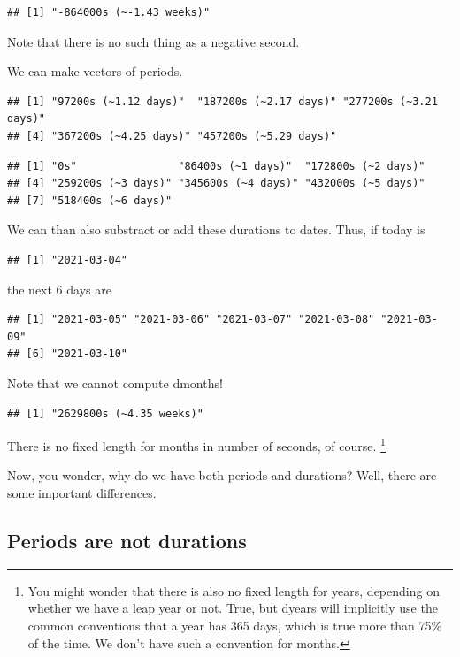 \documentclass[]{tufte-book}
\begin{document}
\begin{verbatim}
## [1] "-864000s (~-1.43 weeks)"
\end{verbatim}

Note that there is no such thing as a negative second.

We can make vectors of periods.

\begin{verbatim}
## [1] "97200s (~1.12 days)"  "187200s (~2.17 days)" "277200s (~3.21 days)"
## [4] "367200s (~4.25 days)" "457200s (~5.29 days)"
\end{verbatim}

\begin{verbatim}
## [1] "0s"                "86400s (~1 days)"  "172800s (~2 days)"
## [4] "259200s (~3 days)" "345600s (~4 days)" "432000s (~5 days)"
## [7] "518400s (~6 days)"
\end{verbatim}

We can than also substract or add these durations to dates. Thus, if today is

\begin{verbatim}
## [1] "2021-03-04"
\end{verbatim}

the next 6 days are

\begin{verbatim}
## [1] "2021-03-05" "2021-03-06" "2021-03-07" "2021-03-08" "2021-03-09"
## [6] "2021-03-10"
\end{verbatim}

Note that we cannot compute dmonths!

\begin{verbatim}
## [1] "2629800s (~4.35 weeks)"
\end{verbatim}

There is no fixed length for months in number of seconds, of course. \footnote{You might wonder that there is also no fixed length for years, depending on whether we have a leap year or not. True, but dyears will implicitly use the common conventions that a year has 365 days, which is true more than 75\% of the time. We don't have such a convention for months.}

Now, you wonder, why do we have both periods and durations? Well, there are some important differences.

\hypertarget{periods-are-not-durations}{%
\subsection{Periods are not durations}\label{periods-are-not-durations}}
\end{document}
